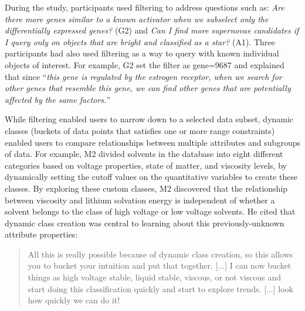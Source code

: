  During the study, participants used filtering
 to address questions such as:
 \textit{Are there more genes similar
 to a known activator when we subselect
 only the differentially expressed genes?} (G2) and \textit{Can I find more supernovae candidates if I query only on objects that are bright and classified as a star?} (A1). Three participants had also used filtering as a way to query with known individual objects of interest. For example, G2 set the filter as gene=9687 and explained that since ``\textit{this gene is regulated by the estrogen receptor, when we search for other genes that resemble this gene, we can find other genes that are potentially affected by the same factors.}''
 \par While filtering enabled users to
 narrow down to a selected data subset,
 dynamic classes (buckets of data points that satisfies one or more range constraints) enabled users to compare
 relationships between multiple attributes and subgroups of data.
 For example, M2 divided solvents in the database
 into eight different categories based on voltage properties,
 state of matter, and viscosity levels,
 by dynamically setting the cutoff values
 on the quantitative variables to create these classes.
 By exploring these custom classes, M2 discovered that the relationship between viscosity and lithium solvation energy is independent of whether a solvent belongs to the class of high voltage or low voltage solvents. He cited that dynamic class creation was central to learning about this previously-unknown attribute properties:
 \begin{quote}
 All this is really possible because of dynamic class creation, so this allows you to bucket your intuition and put that together. [...] I can now bucket things as high voltage stable, liquid stable, viscous, or not viscous and start doing this classification quickly and start to explore trends. [...] look how quickly we can do it!%
 \end{quote}
